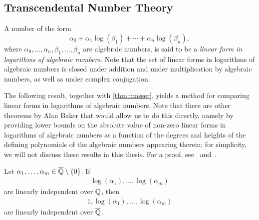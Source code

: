 \subsection{Transcendental Number Theory}


A number of the form
\begin{equation*}
  \alpha_{0} + \alpha_{1} \log(\beta_{1}) + \cdots + \alpha_{n} \log(\beta_{n}),
\end{equation*}
where $\alpha_{0}, \ldots, \alpha_{n}, \beta_{1}, \ldots, \beta_{n}$ are algebraic numbers, is said to be a \emph{linear form in logarithms of algebraic numbers}. Note that the set of linear forms in logarithms of algebraic numbers is closed under addition and under multiplication by algebraic numbers, as well as under complex conjugation.

The following result, together with \cref{thm:masser}, yields a method for comparing linear forms in logarithms of algebraic numbers. Note that there are other theorems by Alan Baker that would allow us to do this directly, namely by providing lower bounds on the absolute value of non-zero linear forms in logarithms of algebraic numbers as a function of the degrees and heights of the defining polynomials of the algebraic numbers appearing therein; for simplicity, we will not discuss these results in this thesis. For a proof, see~\cite{Baker75} and~\cite{BW93}.

\begin{theorem}[Baker]
\label{thm:Baker}
Let $\alpha_{1}, \ldots, \alpha_{m} \in \overline{\mathbb{Q}} \setminus \lbrace 0 \rbrace$. If
\begin{align*}
\log(\alpha_{1}), \ldots, \log(\alpha_{m})
\end{align*}
are linearly independent over $\mathbb{Q}$, then
\begin{align*}
1, \log(\alpha_{1}), \ldots, \log(\alpha_{m})
\end{align*}
are linearly independent over $\overline{\mathbb{Q}}$.
\end{theorem}


